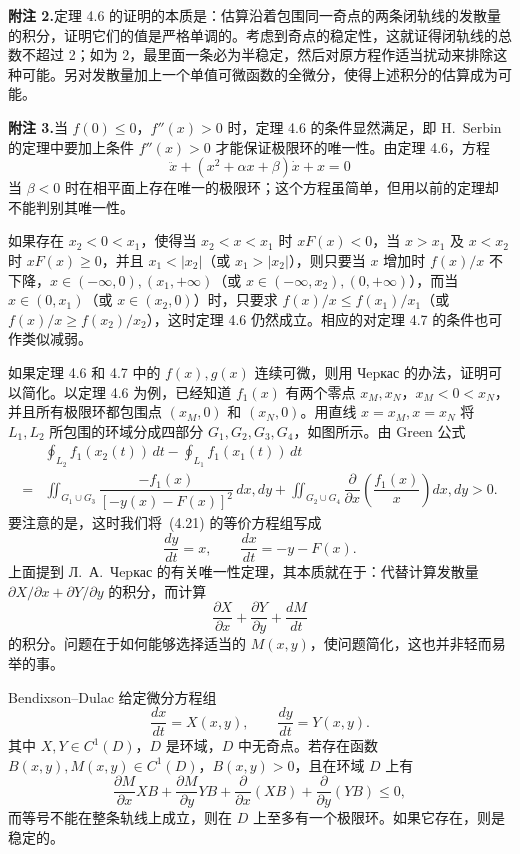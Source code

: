 \textbf{附注 2.}\quad 定理 4.6 的证明的本质是：估算沿着包围同一奇点的两条闭轨线的发散量的积分，证明它们的值是严格单调的。考虑到奇点的稳定性，这就证得闭轨线的总数不超过 2；如为 2，最里面一条必为半稳定，然后对原方程作适当扰动来排除这种可能。另对发散量加上一个单值可微函数的全微分，使得上述积分的估算成为可能。

\textbf{附注 3.}\quad 当 $f(0)\leq0$，$f''(x)>0$ 时，定理 4.6 的条件显然满足，即 H.~Serbin 的定理中要加上条件 $f''(x)>0$ 才能保证极限环的唯一性。由定理 4.6，方程
\[
\ddot{x}+(x^2+\alpha x+\beta)\dot{x}+x=0
\]
当 $\beta<0$ 时在相平面上存在唯一的极限环；这个方程虽简单，但用以前的定理却不能判别其唯一性。

如果存在 $x_2<0<x_1$，使得当 $x_2<x<x_1$ 时 $xF(x)<0$，当 $x>x_1$ 及 $x<x_2$ 时 $xF(x)\geq0$，并且 $x_1<|x_2|$（或 $x_1>|x_2|$），则只要当 $x$ 增加时 $f(x)/x$ 不下降，$x\in(-\infty,0),(x_1,+\infty)$（或 $x\in(-\infty,x_2),(0,+\infty)$），而当 $x\in(0,x_1)$（或 $x\in(x_2,0)$）时，只要求 $f(x)/x\leq f(x_1)/x_1$（或 $f(x)/x\geq f(x_2)/x_2$），这时定理 4.6 仍然成立。相应的对定理 4.7 的条件也可作类似减弱。

如果定理 4.6 和 4.7 中的 $f(x),g(x)$ 连续可微，则用 Чepкас 的办法，证明可以简化。以定理 4.6 为例，已经知道 $f_1(x)$ 有两个零点 $x_M,x_N$，$x_M<0<x_N$，并且所有极限环都包围点 $(x_M,0)$ 和 $(x_N,0)$。用直线 $x=x_M,x=x_N$ 将 $L_1,L_2$ 所包围的环域分成四部分 $G_1,G_2,G_3,G_4$，如图所示。由 Green 公式
\[
\begin{aligned}
&\oint_{L_2}f_1(x_2(t))\,dt-\oint_{L_1}f_1(x_1(t))\,dt\\
={}&\iint_{G_1\cup G_3}\dfrac{-f_1(x)}{[-y(x)-F(x)]^2}\,dx,dy
+\iint_{G_2\cup G_4}\dfrac{\partial}{\partial x}\left(\dfrac{f_1(x)}x\right)dx,dy>0.
\end{aligned}
\]
要注意的是，这时我们将~(4.21) 的等价方程组写成
\[
\dfrac{dy}{dt}=x,\qquad \dfrac{dx}{dt}=-y-F(x).
\]
上面提到 Л.~А.~Чepкас 的有关唯一性定理，其本质就在于：代替计算发散量 $\partial X/\partial x+\partial Y/\partial y$ 的积分，而计算
\[
\dfrac{\partial X}{\partial x}+\dfrac{\partial Y}{\partial y}+\dfrac{dM}{dt}
\]
的积分。问题在于如何能够选择适当的 $M(x,y)$，使问题简化，这也并非轻而易举的事。

\begin{theorem}{Bendixson--Dulac}{ }
给定微分方程组
\[
\dfrac{dx}{dt}=X(x,y),\qquad \dfrac{dy}{dt}=Y(x,y). \tag{4.30}
\]
其中 $X,Y\in C^1(D)$，$D$ 是环域，$D$ 中无奇点。若存在函数 $B(x,y),M(x,y)\in C^1(D)$，$B(x,y)>0$，且在环域 $D$ 上有
\[
\dfrac{\partial M}{\partial x}XB+\dfrac{\partial M}{\partial y}YB
+\dfrac{\partial}{\partial x}(XB)+\dfrac{\partial}{\partial y}(YB)\leq0, \tag{4.31}
\]
而等号不能在整条轨线上成立，则在 $D$ 上至多有一个极限环。如果它存在，则是稳定的。
\end{theorem}

